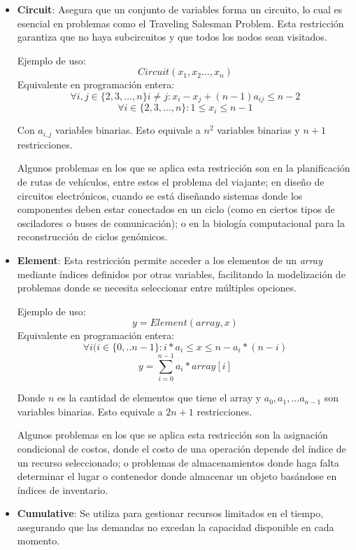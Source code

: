 \documentclass[12pt]{report}
\begin{document}
\begin{itemize}
    \item \textbf{Circuit}: Asegura que un conjunto de variables forma un circuito, lo cual es esencial en problemas como el Traveling Salesman Problem. Esta restricción garantiza que no haya subcircuitos y que todos los nodos sean visitados.
    
    Ejemplo de uso:
    $$Circuit(x_1,x_2...,x_n)$$
    Equivalente en programación entera:
    $$\forall i,j\in\{2,3,...,n\}i\neq j:x_i-x_j+(n-1)a_{ij}\leq n-2$$
    $$\forall i\in\{2,3,...,n\}: 1\leq x_i\leq n-1$$

    Con $a_{i,j}$ variables binarias. Esto equivale a $n^2$ variables binarias y $n+1$ restricciones.

    Algunos problemas en los que se aplica esta restricción son en la planificación de rutas de vehículos, entre estos el problema del viajante; en diseño de circuitos electrónicos, cuando se está diseñando sistemas donde los componentes deben estar conectados en un ciclo (como en ciertos tipos de osciladores o buses de comunicación); o en la biología computacional para la reconstrucción de ciclos genómicos.\\
    
    \item \textbf{Element}: Esta restricción permite acceder a los elementos de un \textit{array} mediante índices definidos por otras variables, facilitando la modelización de problemas donde se necesita seleccionar entre múltiples opciones.

    
    Ejemplo de uso:
    $$y=Element(array,x)$$
    Equivalente en programación entera:
        $$\forall i(i\in\{0,..n-1\}:i*a_i\leq x\leq n - a_i*(n-i)$$
        $$y=\sum_{i=0}^{n-1}a_i*array[i]$$

    Donde $n$ es la cantidad de elementos que tiene el array y $a_0,a_1,...a_{n-1}$ son variables binarias. Esto equivale a $2n+1$ restricciones.

    Algunos problemas en los que se aplica esta restricción son la asignación condicional de costos, donde el costo de una operación depende del índice de un recurso seleccionado; o problemas de almacenamientos donde haga falta determinar el lugar o contenedor donde almacenar un objeto basándose en índices de inventario.\\
    
    \item \textbf{Cumulative}: Se utiliza para gestionar recursos limitados en el tiempo, asegurando que las demandas no excedan la capacidad disponible en cada momento.
    

\end{itemize}
\end{document}
